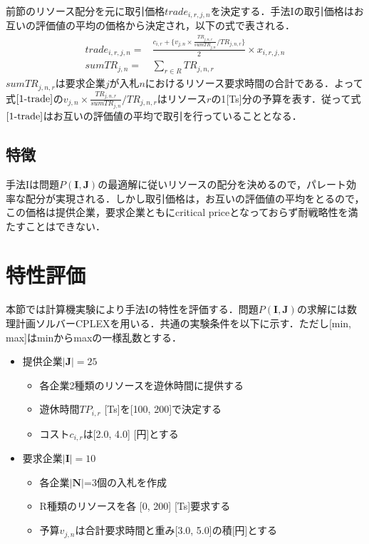 前節のリソース配分を元に取引価格\(trade_{i,r,j,n}\)を決定する．手法Iの取引価格はお互いの評価値の平均の価格から決定され，以下の式で表される．
\begin{align}
trade_{i,r,j,n}=&\frac{c_{i,r}+\{v_{j,n}×\frac{TR_{j,n,r}}{sumTR_{j,n}}/TR_{j,n,r}\}}{2}\times x_{i,r,j,n} \label{1-trade}\\
sumTR_{j,n} = &\sum_{r  \in R} TR_{j,n,r} \label{sumtime}
\end{align}
\(sumTR_{j,n,r}\)は要求企業\(j\)が入札\(n\)におけるリソース要求時間の合計である．よって式\(\eqref{1-trade}\)の\(v_{j,n}×\frac{TR_{j,n,r}}{sumTR_{j,n}}/TR_{j,n,r}\)はリソース\(r\)の1{[}Ts{]}分の予算を表す．従って式\(\eqref{1-trade}\)はお互いの評価値の平均で取引を行っていることとなる．

\hypertarget{ux7279ux5fb4}{%
\subsection{特徴}\label{ux7279ux5fb4}}

手法Iは問題\(P(\boldsymbol{I},\boldsymbol{J})\)の最適解に従いリソースの配分を決めるので，パレート効率な配分が実現される．しかし取引価格は，お互いの評価値の平均をとるので，この価格は提供企業，要求企業ともにcritical
priceとなっておらず耐戦略性を満たすことはできない．

\hypertarget{ux7279ux6027ux8a55ux4fa1}{%
\section{特性評価}\label{ux7279ux6027ux8a55ux4fa1}}

本節では計算機実験により手法Iの特性を評価する．問題\(P(\boldsymbol{I},\boldsymbol{J})\)の求解には数理計画ソルバーCPLEXを用いる．共通の実験条件を以下に示す．ただし{[}min,
max{]}はminからmaxの一様乱数とする．

\begin{itemize}
\tightlist
\item
  提供企業\(|\boldsymbol{J}|=25\)

  \begin{itemize}
  \tightlist
  \item
    各企業2種類のリソースを遊休時間に提供する
  \item
    遊休時間\(TP_{i,r}\) {[}Ts{]}を{[}100, 200{]}で決定する
  \item
    コスト\(c_{i,r}\)は{[}2.0, 4.0{]} {[}円{]}とする
  \end{itemize}
\item
  要求企業\(|\boldsymbol{I}|=10\)

  \begin{itemize}
  \tightlist
  \item
    各企業\(|\boldsymbol{N}|\)=3個の入札を作成
  \item
    R種類のリソースを各 {[}0, 200{]} {[}Ts{]}要求する
  \item
    予算\(v_{j,n}\)は合計要求時間と重み{[}3.0, 5.0{]}の積{[}円{]}とする
  \end{itemize}
\end{itemize}

